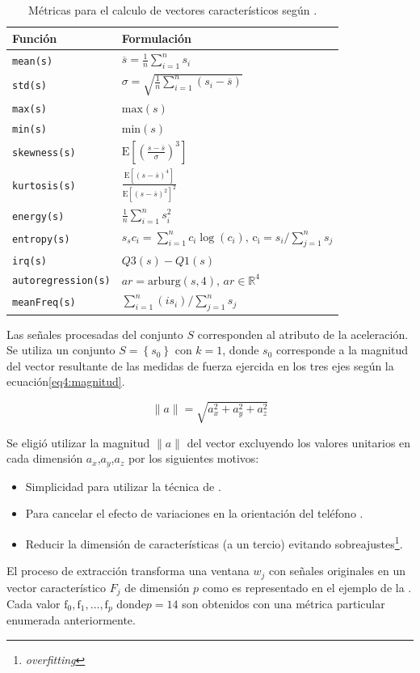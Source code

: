 \begin{table}[!tbph]
\begin{centering}
\begin{tabular}{|l|l|}
\hline 
Función & Formulación\tabularnewline
\hline 
\hline 
\texttt{mean(s)} & $\overline{s}=\frac{1}{n}\sum_{i=1}^{n}s_{i}$\tabularnewline
\hline 
\texttt{std(s)} & $\sigma=\sqrt{\frac{1}{n}\sum_{i=1}^{n}\left(s_{i}-\overline{s}\right)}$\tabularnewline
\hline 
\texttt{max(s)} & $\mathrm{max}(s)$\tabularnewline
\hline 
\texttt{min(s)} & $\mathrm{min}(s)$\tabularnewline
\hline 
\texttt{skewness(s)} & $\mathrm{E}\left[\left(\frac{s-\overline{s}}{\sigma}\right)^{3}\right]$\tabularnewline
\hline 
\texttt{kurtosis(s)} & $\frac{\mathrm{E}\left[\left(s-\overline{s}\right)^{4}\right]}{\mathrm{E}\left[\left(s-\overline{s}\right)^{2}\right]^{2}}$\tabularnewline
\hline 
\texttt{energy(s)} & $\frac{1}{n}\sum_{i=1}^{n}s_{i}^{2}$\tabularnewline
\hline 
\texttt{entropy(s)} & $s_{s}c_{i}=\sum_{i=1}^{n}c_{i}\log\left(c_{i}\right)\mathrm{\mathtt{\mathrm{,}}\,c_{i}}=s_{i}/\sum_{j=1}^{n}s_{j}$\tabularnewline
\hline 
\texttt{irq(s)} & $Q3(s)-Q1(s)$\tabularnewline
\hline 
\texttt{autoregression(s)} & $ar=\mathrm{arburg}\left(s,4\right)\mathrm{,}\,ar\in\mathbb{R}^{4}$\tabularnewline
\hline 
\texttt{meanFreq(s)} & $\sum_{i=1}^{n}\left(is_{i}\right)/\sum_{j=1}^{n}s_{j}$\tabularnewline
\hline 
\end{tabular}
\par\end{centering}
\caption[Métricas de valores característicos]{\label{tab4:metricas}Métricas para el calculo de vectores característicos
según \cite{ReyesOrtiz2015}.}
\end{table}

Las señales procesadas del conjunto $S$ corresponden al atributo
de la aceleración. Se utiliza un conjunto $S=\left\{ s_{0}\right\} $
con $k=1$, donde $s_{0}$ corresponde a la magnitud del vector resultante
de las medidas de fuerza ejercida en los tres ejes según la ecuación\ref{eq4:magnitud}.

\begin{equation}
\lVert a\rVert=\sqrt{a_{x}^{2}+a_{y}^{2}+a_{z}^{2}}\label{eq4:magnitud}
\end{equation}

Se eligió utilizar la magnitud $\lVert a\rVert$ del vector excluyendo
los valores unitarios en cada dimensión $a_{x}$,$a_{y}$,$a_{z}$
por los siguientes motivos:
\begin{itemize}
\item Simplicidad para utilizar la técnica de .
\item Para cancelar el efecto de variaciones en la orientación del teléfono
\cite{Schneider2014}.
\item Reducir la dimensión de características (a un tercio) evitando sobreajustes\footnote{\emph{overfitting}}.
\end{itemize}
El proceso de extracción transforma una ventana $w_{j}$ con señales
originales en un vector característico $F_{j}$ de dimensión $p$
como es representado en el ejemplo de la .
Cada valor $\mathrm{f}_{0},\mathrm{f}_{1},\ldots,\mathrm{f}_{p}$
donde$p=14$ son obtenidos con una métrica particular enumerada anteriormente.

